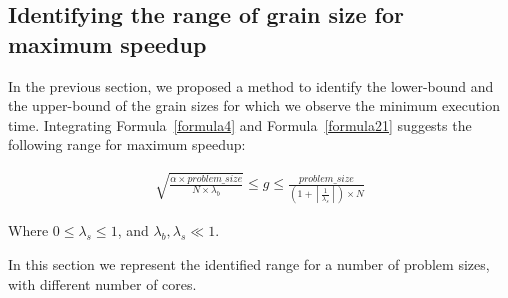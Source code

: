 \vspace{\baselineskip}
\subsection{Identifying the range of grain size for maximum speedup}
In the previous section, we proposed a method to identify the lower-bound and the upper-bound of the grain sizes for which we observe the minimum execution time. 
Integrating Formula~\ref{formula4} and Formula~\ref{formula21} suggests the following range for maximum speedup:


\begin{equation}\label{formula23}
\begin{aligned}
{\sqrt{\frac{\alpha\times{problem\_{size}}}{N\times{\lambda_b}}}}\leq{g}\leq\frac{problem\_{size}}{(1+\left\lceil{\frac{1}{\lambda_s}}\right\rceil)\times{N}}
\end{aligned}
\end{equation}
 
Where $0\leq\lambda_s\leq1$, and $\lambda_b,\lambda_s\ll1$.

In this section we represent the identified range for a number of problem sizes, with different number of cores.





\vspace{\baselineskip}
%

